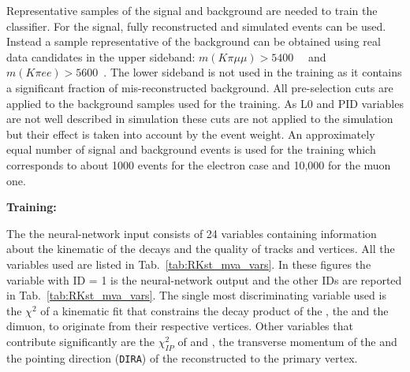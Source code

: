 Representative samples of the signal and background are needed to train the classifier.
For the signal, fully reconstructed \BdToKstmm and \BdKstee simulated events can be used.
Instead a sample representative of the background can be obtained using real data candidates
in the upper \Bz sideband: $m(K\pi\mu\mu) > 5400$~\mevcc~ and $m(K\pi ee) > 5600$~\mevcc.
The lower sideband is not used in the training as it contains a significant fraction of mis-reconstructed background.
All pre-selection cuts are applied to the background samples used for the training.
As L0 and PID variables are not well described in simulation these cuts are not applied to the simulation
but their effect is taken into account by the event weight.
An approximately equal number of signal and background events is used for the training
which corresponds to about 1000 events for the electron case and 10,000 for the muon one.

{\bf Training:}

The the neural-network input consists of 24 variables containing information about the kinematic of the decays
and the quality of tracks and vertices. All the variables used are listed in Tab.~\ref{tab:RKst_mva_vars}.
In these figures the variable with ID = 1 is the neural-network output and the other IDs are reported in Tab.~\ref{tab:RKst_mva_vars}.
%
The single most discriminating variable used is the $\chi^2$ of a kinematic fit
that constrains the decay product of the \Bz, the \Kstarz and the dimuon, to originate from their respective vertices.
Other variables that contribute significantly are the $\chi^2_{IP}$ of \jpsi and \Kstarz, the transverse momentum
of the \Bz and the pointing direction (\verb!DIRA!) of the reconstructed \Bz to the primary vertex.

